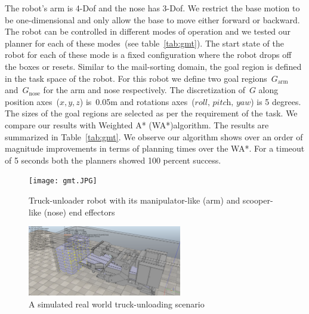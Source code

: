 \documentclass[a4paper,10pt]{article}
\begin{document}
The robot's arm is 4-Dof and the nose has 3-Dof. We restrict the base motion to be one-dimensional and only allow the base to move either forward or backward. The robot can be controlled in different modes of operation and we tested our planner for each of these modes~(see table~\ref{tab:gmt}). The start state of the robot for each of these mode is a fixed configuration where the robot drops off the boxes or resets. Similar to the mail-sorting domain, the goal region is defined in the task space of the robot. For this robot we define two goal regions~$G_{\textrm{arm}}$ and~$G_{\textrm{nose}}$ for the arm and nose respectively. The discretization of~$G$ along position axes~($x,y,z$) is~0.05m and rotations axes~($\textit{roll, pitch, yaw}$) is 5 degrees. The sizes of the goal regions are selected as per the requirement of the task.
We compare our results with Weighted A* (WA*)algorithm. The results are summarized in Table~\ref{tab:gmt}. We observe our algorithm shows over an order of magnitude improvements in terms of planning times over the WA*. For a timeout of 5 seconds both the planners showed 100 percent success.

\begin{figure}
\centering
\texttt{[image: gmt.JPG]}
  \caption{
  Truck-unloader robot with its manipulator-like (arm) and scooper-like (nose) end effectors
}
    \label{fig:gmt}
\end{figure}

\begin{figure}
\centering
\includegraphics[width=0.6\textwidth]{gmt_sim.png}
  \caption{
  A simulated real world truck-unloading scenario
}
    \label{fig:gmt_sim}
\end{figure}
\end{document}
